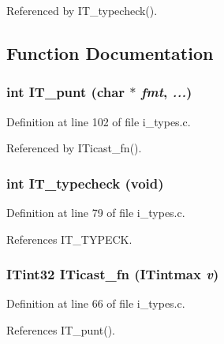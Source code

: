 Referenced by IT\_\-typecheck().

\subsection{Function Documentation}
\subsubsection{\setlength{\rightskip}{0pt plus 5cm}int IT\_\-punt (char $\ast$ {\em fmt},  {\em ...})}\label{i__types_8c_7652eb7f068d9f19837c27063fdc2365}




Definition at line 102 of file i\_\-types.c.

Referenced by ITicast\_\-fn().
\subsubsection{\setlength{\rightskip}{0pt plus 5cm}int IT\_\-typecheck (void)}\label{i__types_8c_352888fde1dec0606fa41bd24abc48f8}




Definition at line 79 of file i\_\-types.c.

References IT\_\-TYPECK.
\subsubsection{\setlength{\rightskip}{0pt plus 5cm}\bf{ITint32} ITicast\_\-fn (\bf{ITintmax} {\em v})}\label{i__types_8c_e37baedf4d86e0c80012c08ea1557e32}




Definition at line 66 of file i\_\-types.c.

References IT\_\-punt().